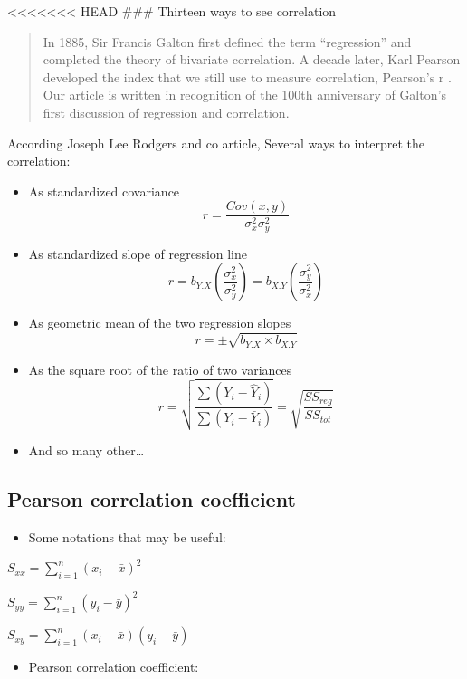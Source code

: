 \documentclass[
]{report}
\providecommand{\tightlist}{%
  \setlength{\itemsep}{0pt}\setlength{\parskip}{0pt}}
\begin{document}
\textless\textless\textless\textless\textless\textless\textless{} HEAD
\#\#\# Thirteen ways to see correlation \citep{13cor}

\begin{quote}
In 1885, Sir Francis Galton first defined the term ``regression'' and completed the theory of bivariate correlation. A decade later, Karl Pearson developed the index that we still use to measure correlation, Pearson's r . Our article is written in recognition of the 100th anniversary of Galton's first discussion of regression and correlation.
\end{quote}

According Joseph Lee Rodgers and co article, Several ways to interpret the correlation:

\begin{itemize}
\tightlist
\item
  As standardized covariance
  \[r=\frac{Cov(x,y)}{\sigma^2_x\sigma^2_y}\]
\item
  As standardized slope of regression line
  \[r=b_{Y.X}\left(\frac{\sigma^2_x}{\sigma^2_y}\right)=b_{X.Y}\left(\frac{\sigma^2_y}{\sigma^2_x}\right)\]
\item
  As geometric mean of the two regression slopes
  \[r=\pm\sqrt{b_{Y.X}\times b_{X.Y}}\]
\item
  As the square root of the ratio of two variances
  \[r=\sqrt{\frac{\sum(Y_i -\hat{Y}_i)}{\sum(Y_i -\bar{Y}_i)}}=\sqrt{\frac{SS_{reg}}{SS_{tot}}}\]
\item
  And so many other\ldots{}
\end{itemize}

\hypertarget{pearson-correlation-coefficient}{%
\subsection{Pearson correlation coefficient}\label{pearson-correlation-coefficient}}

\begin{itemize}
\tightlist
\item
  Some notations that may be useful:
\end{itemize}

\(S_{xx} = \sum_{i=1}^n(x_i -\bar{x})^2\)

\(S_{yy} = \sum_{i=1}^n(y_i -\bar{y})^2\)

\(S_{xy} = \sum_{i=1}^n(x_i -\bar{x})(y_i -\bar{y})\)

\begin{itemize}
\tightlist
\item
  Pearson correlation coefficient:
\end{itemize}
\end{document}
